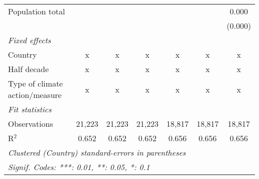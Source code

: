 \begin{tabular}{lcccccc}
   Population total                           &         &                &               &               &               & 0.000\\   
                                              &         &                &               &               &               & (0.000)\\   
   \emph{Fixed effects}\\
   Country                                    & x       & x              & x             & x             & x             & x\\  
   Half decade                                & x       & x              & x             & x             & x             & x\\  
   Type of climate action/measure             & x       & x              & x             & x             & x             & x\\  
   \midrule \emph{Fit statistics}\\
   Observations                               & 21,223  & 21,223         & 21,223        & 18,817        & 18,817        & 18,817\\  
   R$^2$                                      & 0.652   & 0.652          & 0.652         & 0.656         & 0.656         & 0.656\\  
   \midrule
   \multicolumn{7}{l}{\emph{Clustered (Country) standard-errors in parentheses}}\\
   \multicolumn{7}{l}{\emph{Signif. Codes: ***: 0.01, **: 0.05, *: 0.1}}\\
\end{tabular}
\par\endgroup



